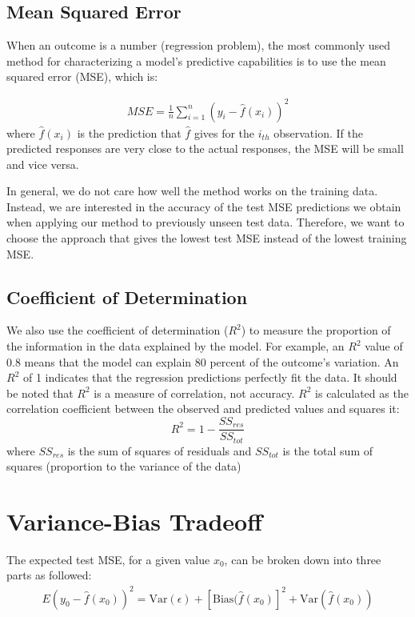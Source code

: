 \subsection{Mean Squared Error}
When an outcome is a number (regression problem), the most commonly used method
for characterizing a model's predictive capabilities is to use the mean squared
error (MSE), which is:

\begin{eqnarray}
    \label{eqn:mse}
    MSE = \frac{1}{n} \sum_{i=1}^{n}(y_i - \hat{f}(x_i))^2
\end{eqnarray}
where $\hat{f}(x_i)$ is the prediction that $\hat{f}$ gives for the $i_{th}$
observation. If the predicted responses are very close to the actual responses,
the MSE will be small and vice versa.

In general, we do not care how well the method works  on the training
data. Instead, we are interested in the accuracy of the test MSE predictions we
obtain when applying our method to previously unseen test data. Therefore, we
want to choose the approach that gives the lowest test MSE instead of the lowest
training MSE.

\subsection{Coefficient of Determination}
We also use the coefficient of determination ($R^2$) to measure the proportion
of the information in the data explained by the model.  For example, an $R^2$
value of 0.8 means that the model can explain  80 percent of the outcome's
variation. An $R^2$ of 1 indicates that the regression predictions perfectly fit
the data. It should be noted that $R^2$ is a measure of correlation, not
accuracy.
$R^2$ is calculated as the correlation coefficient between the
observed and predicted values and squares it:
\[ R^2 = 1 - \frac{SS_{res}}{SS_{tot}}\]
where $SS_{res}$ is the sum of squares of residuals and $SS_{tot}$ is the total
sum of squares (proportion to the variance of the data)

\section{Variance-Bias Tradeoff}
\label{sec:overfitting}

The expected test MSE, for a given value $x_0$, can be broken down into three
parts as followed:
\begin{eqnarray}
E(y_0 - \hat{f}(x_{0}))^2 =  \textrm{Var}(\epsilon) +
[\textrm{Bias}(\hat{f}(x_{0})]^2 + \textrm{Var}(\hat{f}(x_{0}))
\label{eqn:variance-bias-tradeoff}
\end{eqnarray}

